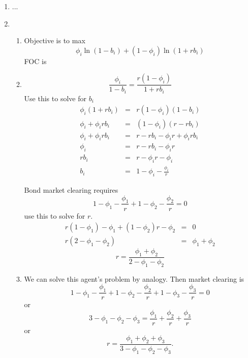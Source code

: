 \documentclass{article}
\begin{document}
\begin{enumerate}
\item ...

\item \ \ \ \ \ \ 

\begin{enumerate}
\item Objective is to max%
\begin{equation*}
\phi _{i}\ln \left( 1-b_{i}\right) +\left( 1-\phi _{i}\right) \ln \left(
1+rb_{i}\right) 
\end{equation*}%
FOC is

\item 
\begin{equation*}
\frac{\phi _{i}}{1-b_{i}}=\frac{r\left( 1-\phi _{i}\right) }{1+rb_{i}}
\end{equation*}%
Use this to solve for $b_{i}$ 
\begin{eqnarray*}
\phi _{i}\left( 1+rb_{i}\right)  &=&r\left( 1-\phi _{i}\right) \left(
1-b_{i}\right)  \\
\phi _{i}+\phi _{i}rb_{i} &=&\left( 1-\phi _{i}\right) \left(
r-rb_{i}\right)  \\
\phi _{i}+\phi _{i}rb_{i} &=&r-rb_{i}-\phi _{i}r+\phi _{i}rb_{i} \\
\phi _{i} &=&r-rb_{i}-\phi _{i}r \\
rb_{i} &=&r-\phi _{i}r-\phi _{i} \\
b_{i} &=&1-\phi _{i}-\frac{\phi _{i}}{r}
\end{eqnarray*}

Bond market clearing requires 
\begin{equation*}
1-\phi _{1}-\frac{\phi _{1}}{r}+1-\phi _{2}-\frac{\phi _{2}}{r}=0
\end{equation*}%
use this to solve for $r$.%
\begin{eqnarray*}
r\left( 1-\phi _{1}\right) -\phi _{1}+\left( 1-\phi _{2}\right) r-\phi _{2}
&=&0 \\
r\left( 2-\phi _{1}-\phi _{2}\right)  &=&\phi _{1}+\phi _{2}
\end{eqnarray*}%
\begin{equation*}
r=\frac{\phi _{1}+\phi _{2}}{2-\phi _{1}-\phi _{2}}
\end{equation*}

\item We can solve this agent's problem by analogy. Then market clearing is 
\begin{equation*}
1-\phi _{1}-\frac{\phi _{1}}{r}+1-\phi _{2}-\frac{\phi _{2}}{r}+1-\phi _{3}-%
\frac{\phi _{3}}{r}=0
\end{equation*}%
or%
\begin{equation*}
3-\phi _{1}-\phi _{2}-\phi _{3}=\frac{\phi _{1}}{r}+\frac{\phi _{2}}{r}+%
\frac{\phi _{3}}{r}
\end{equation*}%
or%
\begin{equation*}
r=\frac{\phi _{1}+\phi _{2}+\phi _{3}}{3-\phi _{1}-\phi _{2}-\phi _{3}}.
\end{equation*}
\end{enumerate}
\end{enumerate}
\end{document}
